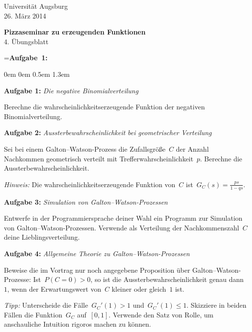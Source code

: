 \documentclass[a4paper,ngerman]{scrartcl}
\theoremstyle{definition}
\theoremstyle{plain}
\theoremstyle{remark}
\begin{document}
\vspace*{-4em}
\begin{flushright}Universität Augsburg \\ 26. März 2014\end{flushright}

\begin{center}\Large \textbf{Pizzaseminar zu erzeugenden Funktionen} \\
4. Übungsblatt
\end{center}
\vspace{1.5em}

\newbox{\mybox}
\setbox\mybox=\hbox{\textbf{Aufgabe 1:}}

\begin{list}{}{0em \leftmargin0em \itemindent0.5em \itemsep 1.3em}
\item[\textbf{Aufgabe 1:}] \emph{Die negative Binomialverteilung}

Berechne die wahrscheinlichkeitserzeugende Funktion der negativen
Binomialverteilung.

\item[\textbf{Aufgabe 2:}] \emph{Aussterbewahrscheinlichkeit bei geometrischer
Verteilung}

Sei bei einem Galton--Watson-Prozess die Zufallsgröße~$C$ der Anzahl Nachkommen
geometrisch verteilt mit Trefferwahrscheinlichkeit~$p$. Berechne die
Aussterbewahrscheinlichkeit.

\emph{Hinweis:} Die wahrscheinlichkeitserzeugende Funktion von~$C$
ist~$G_C(s) = \frac{ps}{1-qs}$.

\item[\textbf{Aufgabe 3:}] \emph{Simulation von Galton--Watson-Prozessen}

Entwerfe in der Programmiersprache deiner Wahl ein Programm zur Simulation von
Galton--Watson-Prozessen. Verwende als Verteilung der
Nachkommenszahl~$C$ deine Lieblingsverteilung.

\item[\textbf{Aufgabe 4:}] \emph{Allgemeine Theorie zu Galton--Watson-Prozessen}

Beweise die im Vortrag nur noch angegebene Proposition über
Galton--Watson-Prozesse: Ist~$P(C = 0) > 0$, so ist die
Aussterbewahrscheinlichkeit genau dann~$1$, wenn der Erwartungswert von~$C$
kleiner oder gleich~$1$ ist.

\emph{Tipp:} Unterscheide die Fälle~$G_C'(1) > 1$ und~$G_C'(1) \leq 1$.
Skizziere in beiden Fällen die Funktion~$G_C$ auf~$[0,1]$. Verwende den Satz
von Rolle, um anschauliche Intuition rigoros machen zu können.
\end{list}
\end{document}
